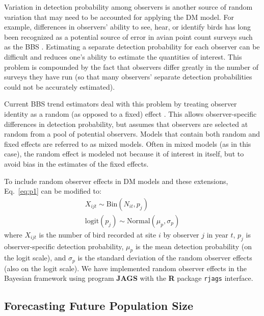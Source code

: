 \documentclass[12pt]{article}
\begin{document}
Variation in detection probability among observers is another source
of random variation that may need to be accounted for applying the DM
model. For example, differences in observers' ability to see, hear, or identify
birds has long been recognized as a potential source of error
in avian point count surveys such as the BBS
\citep{robbins_etal:1986,diefenbach_etal:2003,sauer_etal:1994auk,alldredge_etal:2007auk,campbell_francis:2011}.
Estimating a separate detection probability for each observer can be
difficult and reduces one's ability to estimate the quantities
of interest.  This problem is compounded by the fact that
observers differ greatly in the number of surveys they have
run (so that many observers' separate detection probabilities
could not be accurately estimated).

Current BBS trend estimators deal with this problem by
treating observer identity as a random (as opposed to a fixed)
effect \citep{link_sauer:2002,sauer_link:2011}.
This allows observer-specific differences in detection probability,
but assumes that observers are selected at random from a pool
of potential observers.  Models that contain both random and
fixed effects are referred to as mixed models.  Often in mixed
models (as in this case), the random effect is modeled not
because it of interest in itself, but to avoid bias in the
estimates of the fixed effects.

To include random observer effects in DM models and these extensions,
Eq.~\ref{eq:p1} can be modified to:
\begin{gather}
X_{ijt} \sim \mathrm{Bin}(N_{it}, p_j) \nonumber \\
\mathrm{logit}(p_j) \sim \mathrm{Normal}(\mu_p, \sigma_p)
\label{eq:pobs}
\end{gather}
where $X_{ijt}$ is the number of bird recorded at site $i$ by observer $j$ in
year $t$, $p_j$ is observer-specific detection probability, $\mu_p$ is the mean
detection probability (on the logit scale), and $\sigma_p$ is the standard
deviation of the random observer effects (also on the logit scale).
We have implemented random observer effects in the Bayesian framework
using program \textbf{JAGS} \citep[version 3.2.0]{plummer:2003}
with the \textbf{R} package \texttt{rjags} \citep{plummer:2011, R-2012}
interface.



\subsection{Forecasting Future Population Size}
\end{document}
